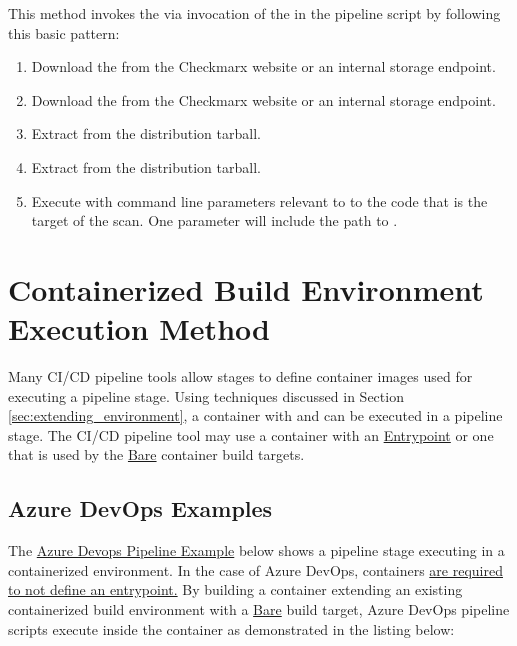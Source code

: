 This method invokes the \scaresolver via invocation of the \cxonecli in the pipeline script by 
following this basic pattern:

\begin{enumerate}
    \item Download the \cxonecli from the Checkmarx website or
    an internal storage endpoint.
    \item Download the \scaresolver from the Checkmarx website or
    an internal storage endpoint.
    \item Extract \cxonecli from the distribution tarball.
    \item Extract \scaresolver from the distribution tarball.
    \item Execute \cxonecli with command line parameters relevant to
    to the code that is the target of the scan.  One parameter will include
    the path to \scaresolver.
\end{enumerate}



\section{Containerized Build Environment Execution Method}

Many CI/CD pipeline tools allow stages to define container images used for
executing a pipeline stage.  Using techniques discussed in
Section \ref{sec:extending_environment}, a container with \cxonecli and \scaresolver
can be executed in a pipeline stage. The CI/CD pipeline tool may use a container with an 
\hyperref[ssec:entrypoint_targets]{Entrypoint} or one that
is used by the \hyperref[ssec:bare_targets]{Bare} container build targets.

\subsection{Azure DevOps Examples}

The \hyperref[listing:ado_pipeline2]{Azure Devops Pipeline Example} below 
shows a pipeline stage executing \scaresolver in a containerized environment.
In the case of Azure DevOps, containers
\href{https://learn.microsoft.com/en-us/azure/devops/pipelines/process/container-phases?view=azure-devops#requirements}{are required to not define an entrypoint.}
By building a container extending an existing containerized build
environment with a \hyperref[ssec:bare_targets]{Bare} build target, Azure DevOps
pipeline scripts execute inside the container as demonstrated in the listing below:\\

